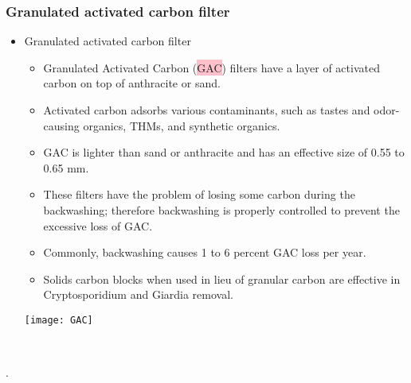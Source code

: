 \subsubsection{Granulated activated carbon filter}
\begin{itemize}
\item Granulated activated carbon filter\\
\vspace{0.3cm}
\begin{minipage}{.6\textwidth}
\begin{itemize}
\item Granulated Activated Carbon (\colorbox{pink}{GAC}) filters have a layer of activated carbon on top of anthracite or sand.
\item Activated carbon adsorbs various contaminants, such as tastes and odor-causing organics, THMs, and synthetic organics. 
\item GAC is lighter than sand or anthracite and has an effective size of 0.55 to 0.65 mm. \item These filters have the problem of losing some carbon during the backwashing; therefore backwashing is properly controlled to prevent the excessive loss of GAC. 
\item Commonly, backwashing causes 1 to 6 percent GAC loss per year.
\item Solids carbon blocks when used in lieu of granular carbon are effective in Cryptosporidium and Giardia removal.
\end{itemize}
\end{minipage}
 \begin{minipage}{0.5\textwidth}
        \centering
       \texttt{[image: GAC]}
    \end{minipage}\\

\end{itemize}.

